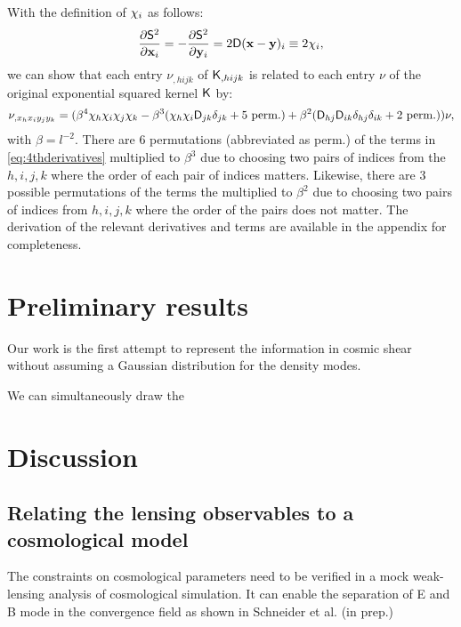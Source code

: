 With the definition of ${\bf \chi}_i$ as follows:
\begin{equation}
	\frac{\partial \mathsf{S}^2}{\partial \mathbf{x}_i} = -\frac{\partial
	\mathsf{S}^2}{\partial \mathbf{y}_i} =
	2 \mathsf{D}(\mathbf{x} - \mathbf{y})_i \equiv 2{\bf \chi}_i,
\end{equation}
we can show that each entry $\nu_{,hijk}$ of $\mathsf{K}_{,hijk}$ is
related to each entry $\nu$ of the original exponential squared kernel
$\mathsf{K}$ by:
\begin{equation}
\nu_{,x_h x_i y_j y_k} = (\beta^4 \chi_h \chi_i \chi_j \chi_k -
\beta^3 (\chi_h \chi_i \mathsf{D}_{jk} \delta_{jk} + 5~{\rm perm.}) + \beta^2
(\mathsf{D}_{hj} \mathsf{D}_{ik}\delta_{hj}\delta_{ik} + 2~{\rm perm.})) \nu,
\label{eq:4thderivatives}
\end{equation}
with $\beta = l^{-2}$. There are 6 permutations (abbreviated as perm.) of the terms in
\ref{eq:4thderivatives}
multiplied to $\beta^3$ due
to choosing two pairs of indices from the $h,i,j,k$ where the order of each
pair of indices matters. Likewise, there are 3 possible permutations of
the terms the multiplied to $\beta^2$ due to choosing two pairs of indices from
$h, i, j, k$ where the order of the pairs does not matter.
The derivation of the relevant derivatives and terms are available 
in the appendix for completeness. 

\section{Preliminary results}
Our work is the first attempt to represent the information in cosmic shear
without assuming a Gaussian distribution for the density modes.  

We can simultaneously draw the  


\section{Discussion}

\subsection{Relating the lensing observables to a cosmological model}
The constraints on cosmological parameters need to be verified in a mock
weak-lensing analysis of cosmological simulation. 
It can enable the separation of E and B mode in the convergence field as shown
in Schneider et al. (in prep.) 

